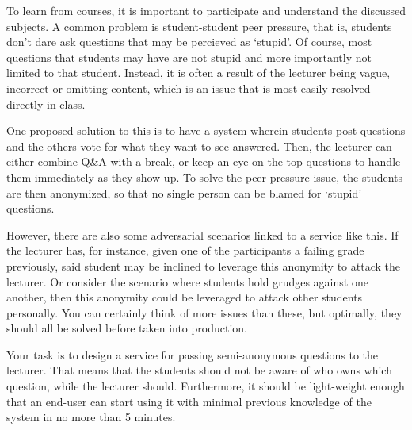 \begin{refsection}
To learn from courses, it is important to participate and understand the discussed subjects. A common problem is student-student peer pressure, that is, students don't dare ask questions that may be percieved as `stupid'. Of course, most questions that students may have are not stupid and more importantly not limited to that student. Instead, it is often a result of the lecturer being vague, incorrect or omitting content, which is an issue that is most easily resolved directly in class.

One proposed solution to this is to have a system wherein students post questions and the others vote for what they want to see answered. Then, the lecturer can either combine Q\&A with a break, or keep an eye on the top questions to handle them immediately as they show up. To solve the peer-pressure issue, the students are then anonymized, so that no single person can be blamed for `stupid' questions.

However, there are also some adversarial scenarios linked to a service like this. If the lecturer has, for instance, given one of the participants a failing grade previously, said student may be inclined to leverage this anonymity to attack the lecturer. Or consider the scenario where students hold grudges against one another, then this anonymity could be leveraged to attack other students personally. You can certainly think of more issues than these, but optimally, they should all be solved before taken into production.

Your task is to design a service for passing semi-anonymous questions to the lecturer. That means that the students should not be aware of who owns which question, while the lecturer should. Furthermore, it should be light-weight enough that an end-user can start using it with minimal previous knowledge of the system in no more than 5 minutes.


\end{refsection}
